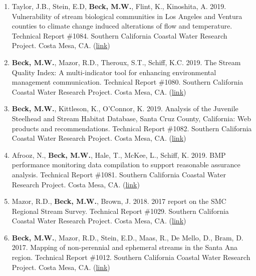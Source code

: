 \documentclass[letterpaper,12pt]{article}
\begin{document}
\begin{enumerate}
\item Taylor, J.B., Stein, E.D, \textbf{Beck, M.W.}, Flint, K., Kinoshita, A. 2019. Vulnerability of stream biological communities in Los Angeles and Ventura counties to climate change induced alterations of flow and temperature. Technical Report \#1084. Southern California Coastal Water Research Project. Costa Mesa, CA. ({\footnotesize\href{http://ftp.sccwrp.org/pub/download/DOCUMENTS/TechnicalReports/1084_ClimateChangeVulnerability.pdf}{link}})

\item \textbf{Beck, M.W.}, Mazor, R.D., Theroux, S.T., Schiff, K.C. 2019. The Stream Quality Index: A multi-indicator tool for enhancing environmental management communication. Technical Report \#1080. Southern California Coastal Water Research Project. Costa Mesa, CA. ({\footnotesize\href{http://ftp.sccwrp.org/pub/download/DOCUMENTS/TechnicalReports/1080_StreamQualityIndex.pdf}{link}})

\item \textbf{Beck, M.W.}, Kittleson, K., O'Connor, K. 2019. Analysis of the Juvenile Steelhead and Stream Habitat Database, Santa Cruz County, California: Web products and recommendations. Technical Report \#1082. Southern California Coastal Water Research Project. Costa Mesa, CA. ({\footnotesize\href{http://ftp.sccwrp.org/pub/download/DOCUMENTS/TechnicalReports/1082_SantaCruzSteelheads.pdf}{link}})

\item Afrooz, N., \textbf{Beck, M.W.}, Hale, T., McKee, L., Schiff, K. 2019. BMP performance monitoring data compilation to support reasonable assurance analysis. Technical Report \#1081. Southern California Coastal Water Research Project. Costa Mesa, CA. ({\footnotesize\href{http://ftp.sccwrp.org/pub/download/DOCUMENTS/TechnicalReports/1081_BMPPerformanceRAA.pdf}{link}})

\item Mazor, R.D., \textbf{Beck, M.W.}, Brown, J. 2018. 2017 report on the SMC Regional Stream Survey. Technical Report \#1029. Southern California Coastal Water Research Project. Costa Mesa, CA. ({\footnotesize\href{http://ftp.sccwrp.org/pub/download/DOCUMENTS/TechnicalReports/1029_2017SMCReport.pdf}{link}})

\item \textbf{Beck, M.W.}, Mazor, R.D., Stein, E.D., Maas, R., De Mello, D., Bram, D. 2017. Mapping of non-perennial and ephemeral streams in the Santa Ana region. Technical Report \#1012. Southern California Coastal Water Research Project. Costa Mesa, CA. ({\footnotesize\href{http://ftp.sccwrp.org/pub/download/DOCUMENTS/TechnicalReports/1012_MappingStreamsSantaAna.pdf}{link}})

\end{enumerate}
\end{document}

